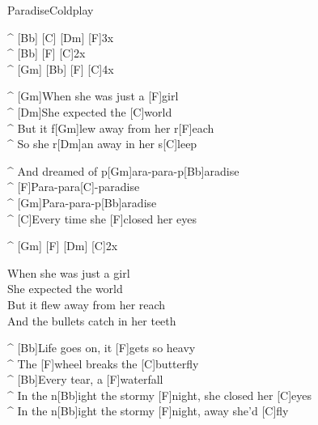 \begin{song}{Paradise}{Coldplay}

\begin{guitar}
^ [Bb] [C] [Dm] [F]\quad 3x \\
^ [Bb] [F] [C]\quad 2x\\
^ [Gm] [Bb] [F] [C]\quad 4x\\
\end{guitar}

\begin{guitar}
^ [Gm]When she was just a [F]girl\\
^ [Dm]She expected the [C]world\\
^ But it f[Gm]lew away from her r[F]each\\
^ So she r[Dm]an away in her s[C]leep\\
\end{guitar}

\begin{guitar}
^ And dreamed of p[Gm]ara-para-p[Bb]aradise\\
^ [F]Para-para[C]-paradise\\
^ [Gm]Para-para-p[Bb]aradise\\
^ [C]Every time she [F]closed her eyes\\
\end{guitar}

\begin{guitar}
^ [Gm] [F] [Dm] [C]\quad 2x\\
\end{guitar}

\begin{guitar}
When she was just a girl\\
She expected the world\\
But it flew away from her reach\\
And the bullets catch in her teeth\\
\end{guitar}

\begin{guitar}
^ [Bb]Life goes on, it [F]gets so heavy\\
^ The [F]wheel breaks the [C]butterfly\\
^ [Bb]Every tear, a [F]waterfall\\
^ In the n[Bb]ight the stormy [F]night, she closed her [C]eyes\\
^ In the n[Bb]ight the stormy [F]night, away she'd [C]fly\\
\end{guitar}


\end{song}
